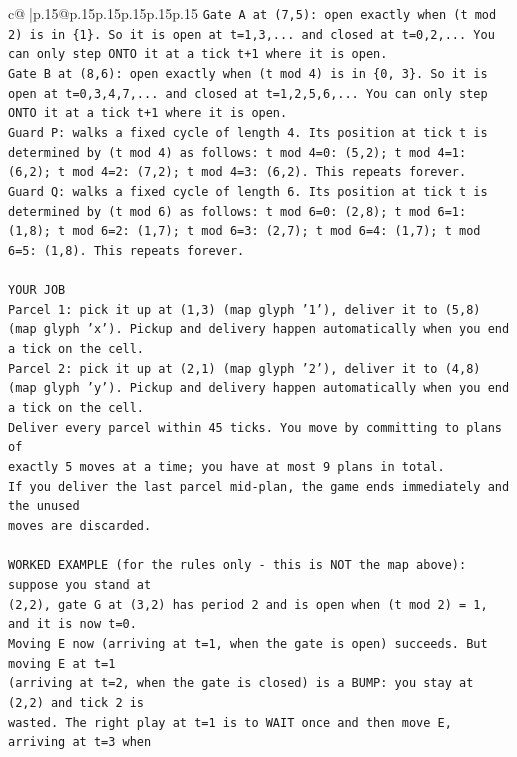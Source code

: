 \documentclass{article}
\begin{document}
{\begin{supertabular}{c@{$\;$}|p{.15\linewidth}@{}p{.15\linewidth}p{.15\linewidth}p{.15\linewidth}p{.15\linewidth}p{.15\linewidth}}
{{{\texttt{Gate A at (7,5): open exactly when (t mod 2) is in \{1\}. So it is open at t=1,3,... and closed at t=0,2,... You can only step ONTO it at a tick t+1 where it is open.} \\
\texttt{Gate B at (8,6): open exactly when (t mod 4) is in \{0, 3\}. So it is open at t=0,3,4,7,... and closed at t=1,2,5,6,... You can only step ONTO it at a tick t+1 where it is open.} \\
\texttt{Guard P: walks a fixed cycle of length 4. Its position at tick t is determined by (t mod 4) as follows: t mod 4=0: (5,2); t mod 4=1: (6,2); t mod 4=2: (7,2); t mod 4=3: (6,2). This repeats forever.} \\
\texttt{Guard Q: walks a fixed cycle of length 6. Its position at tick t is determined by (t mod 6) as follows: t mod 6=0: (2,8); t mod 6=1: (1,8); t mod 6=2: (1,7); t mod 6=3: (2,7); t mod 6=4: (1,7); t mod 6=5: (1,8). This repeats forever.} \\
\\ 
\texttt{YOUR JOB} \\
\texttt{Parcel 1: pick it up at (1,3) (map glyph '1'), deliver it to (5,8) (map glyph 'x'). Pickup and delivery happen automatically when you end a tick on the cell.} \\
\texttt{Parcel 2: pick it up at (2,1) (map glyph '2'), deliver it to (4,8) (map glyph 'y'). Pickup and delivery happen automatically when you end a tick on the cell.} \\
\texttt{Deliver every parcel within 45 ticks. You move by committing to plans of} \\
\texttt{exactly 5 moves at a time; you have at most 9 plans in total.} \\
\texttt{If you deliver the last parcel mid{-}plan, the game ends immediately and the unused} \\
\texttt{moves are discarded.} \\
\\ 
\texttt{WORKED EXAMPLE (for the rules only {-} this is NOT the map above): suppose you stand at} \\
\texttt{(2,2), gate G at (3,2) has period 2 and is open when (t mod 2) = 1, and it is now t=0.} \\
\texttt{Moving E now (arriving at t=1, when the gate is open) succeeds. But moving E at t=1} \\
\texttt{(arriving at t=2, when the gate is closed) is a BUMP: you stay at (2,2) and tick 2 is} \\
\texttt{wasted. The right play at t=1 is to WAIT once and then move E, arriving at t=3 when} \\
}}}
\end{supertabular}}
\end{document}

